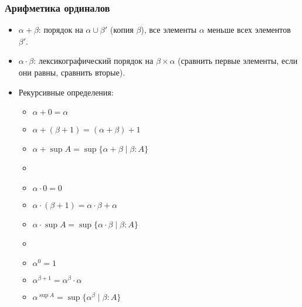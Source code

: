 \documentclass[10pt]{beamer}
\begin{document}
\begin{frame}
    \frametitle{Арифметика ординалов}
    \begin{itemize}
        \item $\alpha + \beta$: порядок на $\alpha \cup \beta'$ (копия $\beta$), все элементы $\alpha$ меньше всех элементов $\beta'$.
        \pause
        \item $\alpha \cdot \beta$: лексикографический порядок на $\beta \times \alpha$ (сравнить первые элементы, если они равны, сравнить вторые).
        \pause
        \item Рекурсивные определения:
        \begin{itemize}
            \item $\alpha + 0 = \alpha$
            \item $\alpha + (\beta + 1) = (\alpha + \beta) + 1$
            \item $\alpha + \sup A = \sup \{\alpha + \beta \mid \beta : A\}$
            \pause
            \item[]
            \item $\alpha \cdot 0 = 0$
            \pause            
            \item $\alpha \cdot (\beta + 1) = \alpha \cdot \beta + \alpha$
            \pause
            \item $\alpha \cdot \sup A = \sup \{\alpha \cdot \beta \mid \beta : A\}$
            \pause
            \item[]
            \item $\alpha^0 = 1$
            \pause            
            \item $\alpha^{\beta + 1} = \alpha ^ \beta \cdot \alpha$
            \pause
            \item $\alpha^{\sup A} = \sup \{\alpha ^ \beta \mid \beta : A\}$
        \end{itemize}
    \end{itemize}
\end{frame}
\end{document}
